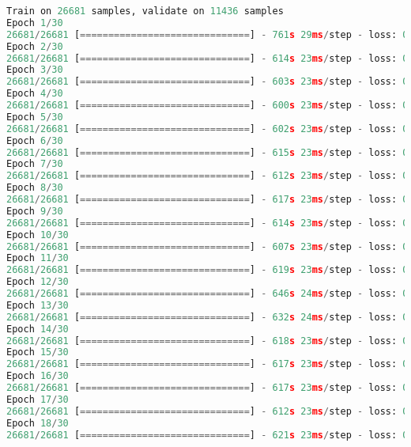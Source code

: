 \begin{lstlisting}[language=Python, caption=Full result of the CNN model]
Train on 26681 samples, validate on 11436 samples
Epoch 1/30
26681/26681 [==============================] - 761s 29ms/step - loss: 0.4788 - acc: 0.7636 - val_loss: 0.4086 - val_acc: 0.8261
Epoch 2/30
26681/26681 [==============================] - 614s 23ms/step - loss: 0.3087 - acc: 0.8720 - val_loss: 0.2370 - val_acc: 0.9053
Epoch 3/30
26681/26681 [==============================] - 603s 23ms/step - loss: 0.2433 - acc: 0.9058 - val_loss: 0.2137 - val_acc: 0.9227
Epoch 4/30
26681/26681 [==============================] - 600s 23ms/step - loss: 0.2038 - acc: 0.9236 - val_loss: 0.1723 - val_acc: 0.9359
Epoch 5/30
26681/26681 [==============================] - 602s 23ms/step - loss: 0.1675 - acc: 0.9368 - val_loss: 0.1495 - val_acc: 0.9479
Epoch 6/30
26681/26681 [==============================] - 615s 23ms/step - loss: 0.1471 - acc: 0.9454 - val_loss: 0.1685 - val_acc: 0.9375
Epoch 7/30
26681/26681 [==============================] - 612s 23ms/step - loss: 0.1295 - acc: 0.9544 - val_loss: 0.1071 - val_acc: 0.9634
Epoch 8/30
26681/26681 [==============================] - 617s 23ms/step - loss: 0.1213 - acc: 0.9551 - val_loss: 0.1053 - val_acc: 0.9621
Epoch 9/30
26681/26681 [==============================] - 614s 23ms/step - loss: 0.1095 - acc: 0.9610 - val_loss: 0.0980 - val_acc: 0.9663
Epoch 10/30
26681/26681 [==============================] - 607s 23ms/step - loss: 0.1035 - acc: 0.9634 - val_loss: 0.1086 - val_acc: 0.9601
Epoch 11/30
26681/26681 [==============================] - 619s 23ms/step - loss: 0.0986 - acc: 0.9646 - val_loss: 0.0866 - val_acc: 0.9676
Epoch 12/30
26681/26681 [==============================] - 646s 24ms/step - loss: 0.0971 - acc: 0.9650 - val_loss: 0.0961 - val_acc: 0.9640
Epoch 13/30
26681/26681 [==============================] - 632s 24ms/step - loss: 0.0939 - acc: 0.9654 - val_loss: 0.0803 - val_acc: 0.9742
Epoch 14/30
26681/26681 [==============================] - 618s 23ms/step - loss: 0.0893 - acc: 0.9680 - val_loss: 0.0766 - val_acc: 0.9735
Epoch 15/30
26681/26681 [==============================] - 617s 23ms/step - loss: 0.0841 - acc: 0.9696 - val_loss: 0.0737 - val_acc: 0.9747
Epoch 16/30
26681/26681 [==============================] - 617s 23ms/step - loss: 0.0817 - acc: 0.9698 - val_loss: 0.0886 - val_acc: 0.9671
Epoch 17/30
26681/26681 [==============================] - 612s 23ms/step - loss: 0.0800 - acc: 0.9702 - val_loss: 0.0728 - val_acc: 0.9739
Epoch 18/30
26681/26681 [==============================] - 621s 23ms/step - loss: 0.0755 - acc: 0.9729 - val_loss: 0.0681 - val_acc: 0.9764

\end{lstlisting}
